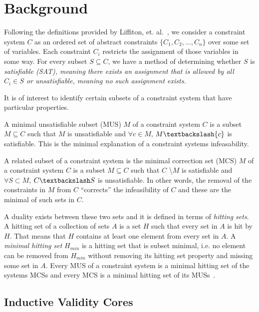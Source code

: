 \section{Background}
Following the definitions provided by Liffiton, et. al.~\cite{liffiton2016fast}, we consider a constraint system $C$ as an ordered set of abstract constraints $\{C_1, C_2,\dots,C_n \}$ over some set of variables. Each constraint $C_i$ restricts the assignment of those variables in some way. For every subset $S \subseteq C$, we have a method of determining whether $S$ is \em{satisfiable} (SAT), meaning there exists an assignment that is allowed by all $C_i \in S$ or \em{unsatisfiable}, meaning no such assignment exists. 

It is of interest to identify certain subsets of a constraint system that have particular properties. 

A minimal unsatisfiable subset (MUS) $M$ of a constraint system $C$ is a subset $M \subseteq C$ such that  $M$ is unsatisfiable and $\forall c \in M$, $M\textbackslash \{c\}$ is satisfiable. This is the minimal explanation of a constraint systems infeasability. 

A related subset of a constraint system is the minimal correction set (MCS) $M$ of a constraint system $C$ is a subset $M \subseteq C$ such that  $C$ \textbackslash $M$ is satisfiable and $\forall S \subset M$, $C\textbackslash S$ is unsatisfiable. In other words, the removal of the constraints in $M$ from $C$ ``corrects'' the infeasibility of $C$ and these are the minimal of such sets in $C$.

A duality exists between these two sets and it is defined in terms of {\em hitting sets}. A hitting set of a collection of sets $A$ is a set $H$ such that every set in $A$ is hit by $H$. That means that $H$ contains at least one element from every set in $A$. A {\em minimal hitting set} $H_{min}$ is a hitting set that is subset minimal, i.e. no element can be removed from $H_{min}$ without removing its hitting set property and missing some set in $A$. Every MUS of a constraint system is a minimal hitting set of the systems MCSs and every MCS is a minimal hitting set of its MUSs~\cite{reiter1987theory, de1987diagnosing, liffiton2016fast}. 

\subsection{Inductive Validity Cores}

